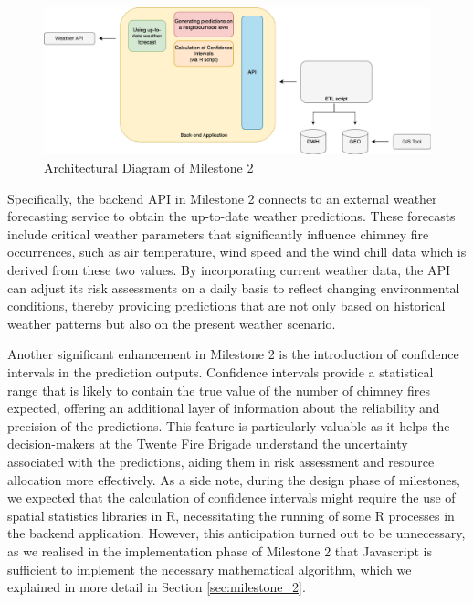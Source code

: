 \documentclass{utitcphd_overleaf}
\begin{document}
\begin{figure}[ht]
  \centering
  \includegraphics[width=1\textwidth]{my_images/milestones/iteration_2_arch.pdf}
  \caption{Architectural Diagram of Milestone 2}
  \label{fig:iteration_2_arch}
\end{figure}

Specifically, the backend API in Milestone 2 connects to an external weather forecasting service to obtain the up-to-date weather predictions. These forecasts include critical weather parameters that significantly influence chimney fire occurrences, such as air temperature, wind speed and the wind chill data which is derived from these two values. By incorporating current weather data, the API can adjust its risk assessments on a daily basis to reflect changing environmental conditions, thereby providing predictions that are not only based on historical weather patterns but also on the present weather scenario.

Another significant enhancement in Milestone 2 is the introduction of confidence intervals in the prediction outputs. Confidence intervals provide a statistical range that is likely to contain the true value of the number of chimney fires expected, offering an additional layer of information about the reliability and precision of the predictions. This feature is particularly valuable as it helps the decision-makers at the Twente Fire Brigade understand the uncertainty associated with the predictions, aiding them in risk assessment and resource allocation more effectively. As a side note, during the design phase of milestones, we expected that the calculation of confidence intervals might require the use of spatial statistics libraries in R, necessitating the running of some R processes in the backend application. However, this anticipation turned out to be unnecessary, as we realised in the implementation phase of Milestone 2 that Javascript is sufficient to implement the necessary mathematical algorithm, which we explained in more detail in Section \ref{sec:milestone_2}.
\end{document}
